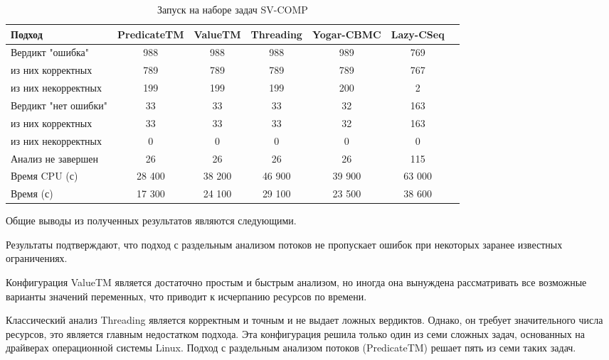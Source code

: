 \begin{center}
  \begin{table}[h]\footnotesize
  	\label{table-sv-comp-tools}
    \caption{Запуск на наборе задач SV-COMP}
    \begin{tabular}{ | l | c | c | c | c | c | c |}
      \hline
      Подход         				& PredicateTM   & ValueTM 	& Threading & Yogar-CBMC 	& Lazy-CSeq  \\ \hline
      Вердикт "ошибка" 				& 988    		& 988       & 988      	& 989       	& 769       \\ 
  \hspace{0.5cm} из них корректных 	& 789 			& 789 		& 789      	& 789       	& 767       \\ 
  \hspace{0.5cm} из них некорректных & 199 			& 199 		& 199    	& 200       	& 2          \\ \hline
      Вердикт "нет ошибки"  		& 33      		& 33        & 33       	& 32        	& 163     \\ 
  \hspace{0.5cm} из них корректных 	& 33 			& 33    	& 33       	& 32        	& 163       \\
  \hspace{0.5cm} из них некорректных & 0 			& 0    		& 0       	& 0         	& 0        \\ \hline
      Анализ не завершен       		& 26     		& 26        & 26       	& 26        	& 115      \\ \hline
      Время CPU (с)   				& 28 400 		& 38 200    & 46 900  	& 39 900    	& 63 000    \\ 
      Время (с)  					& 17 300 		& 24 100    & 29 100   	& 23 500    	& 38 600    \\
      \hline
    \end{tabular}
  \end{table}
\end{center}

Общие выводы из полученных результатов являются следующими.

Результаты подтверждают, что подход с раздельным анализом потоков не пропускает ошибок при некоторых заранее известных ограничениях.

Конфигурация ValueTM является достаточно простым и быстрым анализом, но иногда она вынуждена рассматривать все возможные варианты значений переменных, что приводит к исчерпанию ресурсов по времени.

Классический анализ Threading является корректным и точным и не выдает ложных вердиктов.
Однако, он требует значительного числа ресурсов, это является главным недостатком подхода.
Эта конфигурация решила только один из семи сложных задач, основанных на драйверах операционной системы Linux.
Подход с раздельным анализом потоков (PredicateTM) решает пять из семи таких задач. 

